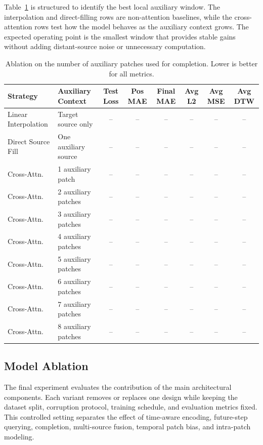 Table~\ref{tab:local-patch-length-ablation} is structured to identify the best local auxiliary window. The interpolation and direct-filling rows are non-attention baselines, while the cross-attention rows test how the model behaves as the auxiliary context grows. The expected operating point is the smallest window that provides stable gains without adding distant-source noise or unnecessary computation.

\begin{table}[t]
    \centering
    \caption{Ablation on the number of auxiliary patches used for completion. Lower is better for all metrics.}
    \label{tab:local-patch-length-ablation}
    \small
    \begin{tabularx}{\textwidth}{lXcccccc}
        \hline
        Strategy & Auxiliary Context & Test Loss & Pos MAE & Final MAE & Avg L2 & Avg MSE & Avg DTW \\
        \hline
        Linear Interpolation & Target source only & -- & -- & -- & -- & -- & -- \\
        Direct Source Fill & One auxiliary source & -- & -- & -- & -- & -- & -- \\
        Cross-Attn. & 1 auxiliary patch & -- & -- & -- & -- & -- & -- \\
        Cross-Attn. & 2 auxiliary patches & -- & -- & -- & -- & -- & -- \\
        Cross-Attn. & 3 auxiliary patches & -- & -- & -- & -- & -- & -- \\
        Cross-Attn. & 4 auxiliary patches & -- & -- & -- & -- & -- & -- \\
        Cross-Attn. & 5 auxiliary patches & -- & -- & -- & -- & -- & -- \\
        Cross-Attn. & 6 auxiliary patches & -- & -- & -- & -- & -- & -- \\
        Cross-Attn. & 7 auxiliary patches & -- & -- & -- & -- & -- & -- \\
        Cross-Attn. & 8 auxiliary patches & -- & -- & -- & -- & -- & -- \\
        \hline
    \end{tabularx}
\end{table}

\subsection{Model Ablation}
\label{subsec:ablation-study}

The final experiment evaluates the contribution of the main architectural components. Each variant removes or replaces one design while keeping the dataset split, corruption protocol, training schedule, and evaluation metrics fixed. This controlled setting separates the effect of time-aware encoding, future-step querying, completion, multi-source fusion, temporal patch bias, and intra-patch modeling.

